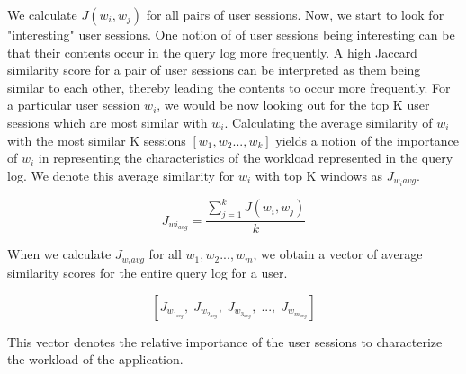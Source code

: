 We calculate $J(w_i,w_j)$ for all pairs of user sessions. Now, we start to look for "interesting" user sessions. One notion of of user sessions being interesting can be that their contents occur in the query log more frequently. A high Jaccard similarity score for a pair of user sessions can be interpreted as them being similar to each other, thereby leading the contents to occur more frequently. For a particular user session $w_i$, we would be now looking out for the top K user sessions which are most similar with $w_i$. Calculating the average similarity of $w_i$ with the most similar K sessions $[w_1,w_2..., w_k]$ yields a notion of the importance of $w_i$ in representing the characteristics of the workload represented in the query log. We denote this average similarity for $w_i$ with top K windows as $J_{w_i{avg}}$.

$$J_{wi_{avg}}= \frac{\sum_{j=1}^{k} J(w_i,w_j)}{k}$$

When we calculate $J_{w_i{avg}}$ for all $w_1,w_2...,w_m$, we obtain a vector of average similarity scores for the entire query log for a user.

$$[J_{w_{1_{avg}}},\;J_{w_{2_{avg}}},\;J_{w_{3_{avg}}},\;...,\;J_{w_{m_{avg}}}]$$

This vector denotes the relative importance of the user sessions to characterize the workload of the application. 


